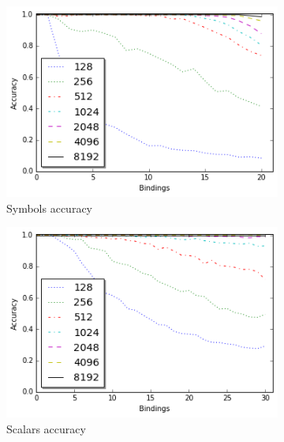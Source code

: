 \documentclass[a4paper,twoside]{article}
\begin{document}
		\begin{figure}[th!]
			\begin{subfigure}{0.45\columnwidth}
				\center
				\includegraphics[width=1\columnwidth]{img/capacity.png}
				\caption{Symbols accuracy}
				\label{fig:capacity}
			\end{subfigure}
			\begin{subfigure}{0.45\columnwidth}
				\center
				\includegraphics[width=1\columnwidth]{img/capacity_scalar_30.png}
				\caption{Scalars accuracy}
				\label{fig:capacity_scalar}
			\end{subfigure}	
			\center
			\begin{subfigure}{0.45\columnwidth}
				\center

\end{subfigure}
\end{figure}
\end{document}
